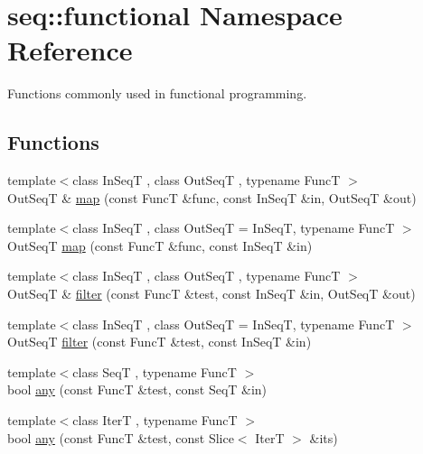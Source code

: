 \hypertarget{namespaceseq_1_1functional}{\section{seq\-:\-:functional Namespace Reference}
\label{namespaceseq_1_1functional}
}


Functions commonly used in functional programming.  


\subsection*{Functions}
\begin{DoxyCompactItemize}
\item 
{\footnotesize template$<$class In\-Seq\-T , class Out\-Seq\-T , typename Func\-T $>$ }\\Out\-Seq\-T \& \hyperlink{namespaceseq_1_1functional_aeb7a2a2bde9d01d3b9a2d051895c4bd3}{map} (const Func\-T \&func, const In\-Seq\-T \&in, Out\-Seq\-T \&out)
\item 
{\footnotesize template$<$class In\-Seq\-T , class Out\-Seq\-T  = In\-Seq\-T, typename Func\-T $>$ }\\Out\-Seq\-T \hyperlink{namespaceseq_1_1functional_a76883f3fd6a38cd64cef81996fd7c55d}{map} (const Func\-T \&func, const In\-Seq\-T \&in)
\item 
{\footnotesize template$<$class In\-Seq\-T , class Out\-Seq\-T , typename Func\-T $>$ }\\Out\-Seq\-T \& \hyperlink{namespaceseq_1_1functional_aed84dc168049247667f4b5e1acab0a75}{filter} (const Func\-T \&test, const In\-Seq\-T \&in, Out\-Seq\-T \&out)
\item 
{\footnotesize template$<$class In\-Seq\-T , class Out\-Seq\-T  = In\-Seq\-T, typename Func\-T $>$ }\\Out\-Seq\-T \hyperlink{namespaceseq_1_1functional_a9d3e49b1ecec98ba85b542e34f5aa49f}{filter} (const Func\-T \&test, const In\-Seq\-T \&in)
\item 
{\footnotesize template$<$class Seq\-T , typename Func\-T $>$ }\\bool \hyperlink{namespaceseq_1_1functional_af37c37565d46fd40770cf70587541af8}{any} (const Func\-T \&test, const Seq\-T \&in)
\item 
{\footnotesize template$<$class Iter\-T , typename Func\-T $>$ }\\bool \hyperlink{namespaceseq_1_1functional_acffc3ce2a2c0eae89c039acb854ed128}{any} (const Func\-T \&test, const Slice$<$ Iter\-T $>$ \&its)

\end{DoxyCompactItemize}
